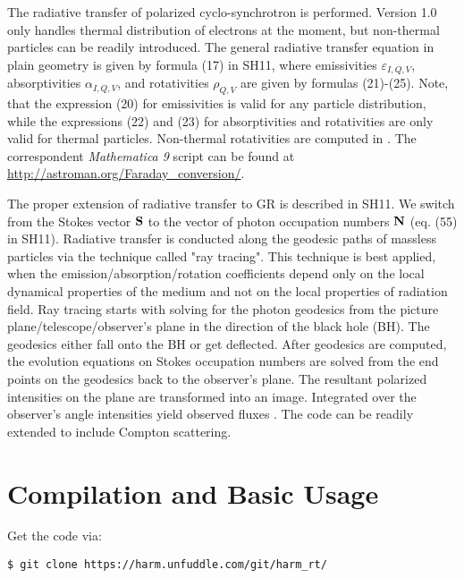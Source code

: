 \documentclass{emulateapj}
\newcommand{\mat}{\textit{Mathematica 9 }}
\begin{document}
The radiative transfer of polarized cyclo-synchrotron is
performed. Version 1.0 only handles thermal distribution of electrons
at the moment, but non-thermal particles can be readily introduced.
The general radiative transfer equation in plain geometry is given by
formula (17) in SH11, where emissivities $\varepsilon_{I,Q,V}$,
absorptivities $\alpha_{I,Q,V}$, and rotativities $\rho_{Q,V}$ are
given by formulas (21)-(25). Note, that the expression (20) for
emissivities is valid for any particle distribution, while the
expressions (22) and (23) for absorptivities and rotativities are only
valid for thermal particles. Non-thermal rotativities are computed in
\citet{Huang:2011de}. The correspondent \mat script can be found at
\url{http://astroman.org/Faraday_conversion/}.

The proper extension of radiative transfer to GR is described in
SH11. We switch from the Stokes vector ${\bf S}$ to the vector of
photon occupation numbers ${\bf N}$ (eq. (55) in SH11).  Radiative
transfer is conducted along the geodesic paths of massless particles
via the technique called "ray tracing". This technique is best
applied, when the emission/absorption/rotation coefficients depend
only on the local dynamical properties of the medium and not on the
local properties of radiation field.  Ray tracing starts with solving
for the photon geodesics from the picture plane/telescope/observer's
plane in the direction of the black hole (BH).  The geodesics either
fall onto the BH or get deflected. After geodesics are computed, the
evolution equations on Stokes occupation numbers are solved from the
end points on the geodesics back to the observer's plane. The
resultant polarized intensities on the plane are transformed into an
image.  Integrated over the observer's angle intensities yield
observed fluxes \citep{Rybicki1979}. The code can be readily extended
to include Compton scattering.


\section{Compilation and Basic Usage}

Get the code via:
\begin{verbatim}
$ git clone https://harm.unfuddle.com/git/harm_rt/
\end{verbatim}
\end{document}

